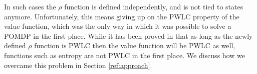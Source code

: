 In such cases the $\rho$ function is defined independently, and is not tied to states anymore.
Unfortunately, this means giving up on the PWLC property of the value function, which was the only 
way in which it was possible to solve a POMDP in the first place. While it has been proved in
\cite{cit:rpomdp} that as long as the newly defined $\rho$ function is PWLC then the value function
will be PWLC as well, functions such as entropy are not PWLC in the first place. We discuss how we
overcame this problem in Section \ref{ref:approach}.


